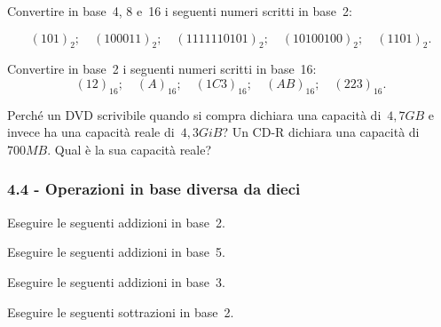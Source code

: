 
\begin{esercizio}
\label{ese:4.18}
Convertire in base~4, 8 e~16 i seguenti numeri scritti in base~2:

\[(101)_{2};\quad(100011)_{2};\quad (1111110101)_{2};\quad (10100100)_{2};\quad (1101)_{2}.\]
\end{esercizio}


\begin{esercizio}
\label{ese:4.19}
Convertire in base~2 i seguenti numeri scritti in base~16:
\[(12)_{16};\quad (A)_{16};\quad (1C3)_{16};\quad (AB)_{16};\quad (223)_{16}.\]
\end{esercizio}


\begin{esercizio}[\Ast]
 \label{ese:4.20}
Perché un DVD scrivibile quando si compra dichiara una capacità di~$4,7\unit{GB}$ e
invece ha una capacità reale di~$4,3\unit{GiB}$? Un CD-R dichiara una
capacità di~$700\unit{MB}$. Qual è la sua capacità reale?
\end{esercizio}

\subsubsection*{4.4 - Operazioni in base diversa da dieci}

\begin{esercizio}
\label{ese:4.21}
Eseguire le seguenti addizioni in base~2.

 
\end{esercizio}

\begin{esercizio}
\label{ese:4.22}
Eseguire le seguenti addizioni in base~5.

 
\end{esercizio}


\begin{esercizio}
\label{ese:4.23}
Eseguire le seguenti addizioni in base~3.

 
\end{esercizio}

\begin{esercizio}
 \label{ese:4.24}
 Eseguire le seguenti sottrazioni in base~2.

 
\end{esercizio}

